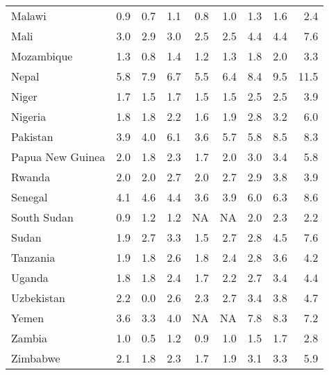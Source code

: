 \begin{table}[b]
{\begin{tabular}[t]{lrrrrrrrr}
Malawi & 0.9 & 0.7 & 1.1 & 0.8 & 1.0 & 1.3 & 1.6 & 2.4\\
Mali & 3.0 & 2.9 & 3.0 & 2.5 & 2.5 & 4.4 & 4.4 & 7.6\\
Mozambique & 1.3 & 0.8 & 1.4 & 1.2 & 1.3 & 1.8 & 2.0 & 3.3\\
Nepal & 5.8 & 7.9 & 6.7 & 5.5 & 6.4 & 8.4 & 9.5 & 11.5\\
Niger & 1.7 & 1.5 & 1.7 & 1.5 & 1.5 & 2.5 & 2.5 & 3.9\\
Nigeria & 1.8 & 1.8 & 2.2 & 1.6 & 1.9 & 2.8 & 3.2 & 6.0\\
Pakistan & 3.9 & 4.0 & 6.1 & 3.6 & 5.7 & 5.8 & 8.5 & 8.3\\
Papua New Guinea & 2.0 & 1.8 & 2.3 & 1.7 & 2.0 & 3.0 & 3.4 & 5.8\\
Rwanda & 2.0 & 2.0 & 2.7 & 2.0 & 2.7 & 2.9 & 3.8 & 3.9\\
Senegal & 4.1 & 4.6 & 4.4 & 3.6 & 3.9 & 6.0 & 6.3 & 8.6\\
South Sudan & 0.9 & 1.2 & 1.2 & NA & NA & 2.0 & 2.3 & 2.2\\
Sudan & 1.9 & 2.7 & 3.3 & 1.5 & 2.7 & 2.8 & 4.5 & 7.6\\
Tanzania & 1.9 & 1.8 & 2.6 & 1.8 & 2.4 & 2.8 & 3.6 & 4.2\\
Uganda & 1.8 & 1.8 & 2.4 & 1.7 & 2.2 & 2.7 & 3.4 & 4.4\\
Uzbekistan & 2.2 & 0.0 & 2.6 & 2.3 & 2.7 & 3.4 & 3.8 & 4.7\\
Yemen & 3.6 & 3.3 & 4.0 & NA & NA & 7.8 & 8.3 & 7.2\\
Zambia & 1.0 & 0.5 & 1.2 & 0.9 & 1.0 & 1.5 & 1.7 & 2.8\\
Zimbabwe & 2.1 & 1.8 & 2.3 & 1.7 & 1.9 & 3.1 & 3.3 & 5.9\\
\bottomrule
\end{tabular}}
\end{table}
